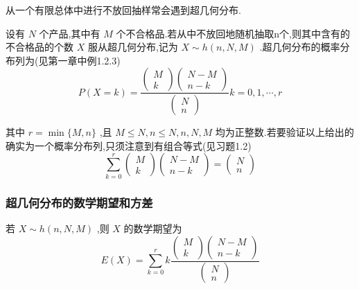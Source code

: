 从一个有限总体中进行不放回抽样常会遇到超几何分布.

设有 $ N $ 个产品,其中有 $ M $ 个不合格品.若从中不放回地随机抽取n个,则其中含有的不合格品的个数 $ X $ 服从超几何分布,记为 $ X \sim h(n, N, M) $ .超几何分布的概率分布列为(见第一章中例1.2.3)
\begin{equation}
P(X=k)=\frac{\left( \begin{array}{c}{M} \\ {k}\end{array}\right) \left( \begin{array}{c}{N-M} \\ {n-k}\end{array}\right)}{\left( \begin{array}{c}{N} \\ {n}\end{array}\right)} k=0,1, \cdots, r \label{eq:2.4.6}
\end{equation}

其中 $ r=\min \{M, n\} $ ,且 $ M \leqslant N, n \leqslant N, n, N, M $ 均为正整数.若要验证以上给出的确实为一个概率分布列,只须注意到有组合等式(见习题1.2)
\[
\sum_{k=0}^{r} \left( \begin{array}{c}{M} \\ {k}\end{array}\right) \left( \begin{array}{c}{N-M} \\ {n-k}\end{array}\right)=\left( \begin{array}{l}{N} \\ {n}\end{array}\right)
\]

\subsubsection{超几何分布的数学期望和方差}

若 $ X \sim h(n, N, M) $ ,则 $ X $ 的数学期望为
\[
E(X)=\sum_{k=0}^{r} k \frac{\left( 
	\begin{array}{c}
	{M} \\ 
	{k}
	\end{array}
	\right) 
	\left( 
	\begin{array}{c}
	{N-M} \\ 
	{n-k}
	\end{array}
	\right)}{\left( 
	\begin{array}{l}
	{N} \\ 
	{n}
	\end{array}
	\right)}
\]

